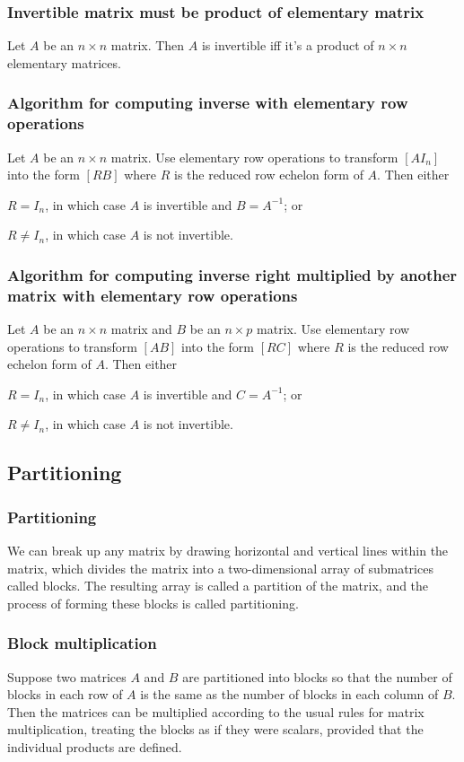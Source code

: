 \documentclass[a4paper,12pt]{report}
\begin{document}
\subsubsection{Invertible matrix must be product of elementary matrix}
Let $A$ be an $n\times n$ matrix. Then $A$ is invertible iff it's a product of $n\times n$ elementary matrices.
\subsubsection{Algorithm for computing inverse with elementary row operations}
Let $A$ be an $n\times n$ matrix. Use elementary row operations to transform $[A I_n]$ into the form $[R B]$ where $R$ is the reduced row echelon form of $A$. Then either
\bit
\item $R=I_n$, in which case $A$ is invertible and $B=A^{-1}$; or
\item $R\ne I_n$, in which case $A$ is not invertible.
\eit
\subsubsection{Algorithm for computing inverse right multiplied by another matrix with elementary row operations}
Let $A$ be an $n\times n$ matrix and $B$ be an $n\times p$ matrix. Use elementary row operations to transform $[A B]$ into the form $[R C]$ where $R$ is the reduced row echelon form of $A$. Then either
\bit
\item $R=I_n$, in which case $A$ is invertible and $C=A^{-1}$; or
\item $R\ne I_n$, in which case $A$ is not invertible.
\eit
\subsection{Partitioning}
\subsubsection{Partitioning}
We can break up any matrix by drawing horizontal and vertical lines within the matrix, which divides the matrix into a two-dimensional array of submatrices called blocks. The resulting array is called a partition of the matrix, and the process of forming these blocks is called partitioning.
\subsubsection{Block multiplication}
Suppose two matrices $A$ and $B$ are partitioned into blocks so that the number of blocks in each row of $A$ is the same as the number of blocks in each column of $B$. Then the matrices can be multiplied according to the usual rules for matrix multiplication, treating the blocks as if they were scalars, provided that the individual products are defined.
\end{document}
